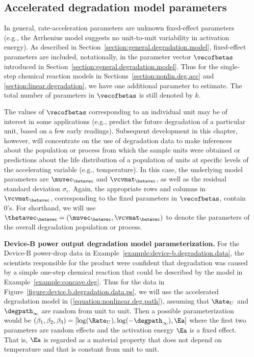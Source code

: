 \subsection{Accelerated degradation model parameters}

In general, rate-acceleration parameters are unknown
fixed-effect parameters (e.g., the Arrhenius model suggests no
unit-to-unit variability in activation energy).  As described in
Section~\ref{section:general.degradation.model}, fixed-effect
parameters are included, notationally, in the parameter vector
$\vecofbetas$ introduced in Section~\ref{section:general.degradation.model}. 
Thus for the single-step chemical reaction models in 
Sections~\ref{section:nonlin.deg.acc} and
\ref{section:linear.degradation}, we have one additional parameter to
estimate. The total number of parameters in $\vecofbetas$ 
is still denoted by $k$.

The values of $\vecofbetas$ corresponding to an individual
unit may be of interest in some applications (e.g., predict the
future degradation of a particular unit, based on a few early
readings). Subsequent development in this chapter, however, will
concentrate on the use of degradation data to make inferences about
the population or process from which the sample units were obtained or
predictions about the life distribution of a population of units 
at specific levels of the accelerating variable (e.g., temperature). In this
case, the underlying model parameters are $\muvec_{\betavec}$ and
$\vcvmat_{\betavec}$, as well as the residual standard deviation
$\sigma_{\epsilon}$.  Again, the appropriate rows and columns in
$\vcvmat_{\betavec}$, corresponding to the fixed parameters in
$\vecofbetas$, contain $0$'s. For shorthand, we will use
$\thetavec_{\betavec}=(\muvec_{\betavec},\vcvmat_{\betavec})$ to denote
the parameters of the overall degradation population or process.

\begin{example}{\bf Device-B power output degradation model
parameterization.}
\label{example:device.b.parameterization}
For the Device-B power-drop data in 
Example~\ref{example:device-b.degradation.data}, 
the scientists responsible for
the product were confident that degradation was caused by a simple
one-step chemical reaction that could be described by the model in
Example~\ref{example:concave.deg}. Thus for the data in
Figure~\ref{figure:device.b.degradation.data.ps}, we will use the
accelerated degradation model in (\ref{equation:nonlinear.deg.path}),
assuming that $\Rate_{U}$ and $\degpath_{\infty}$ are random from
unit to unit.  Then a possible parameterization would be
$(\beta_{1},\beta_{2},\beta_{3}) =
[\log(\Rate_{U}),\log(-\degpath_{\infty}),\Ea]$ where the first two
parameters are random effects and the activation energy $\Ea$ is a fixed
effect.  That is, $\Ea$ is regarded as a material property that does
not depend on temperature and that is constant from unit to unit.
\end{example}

